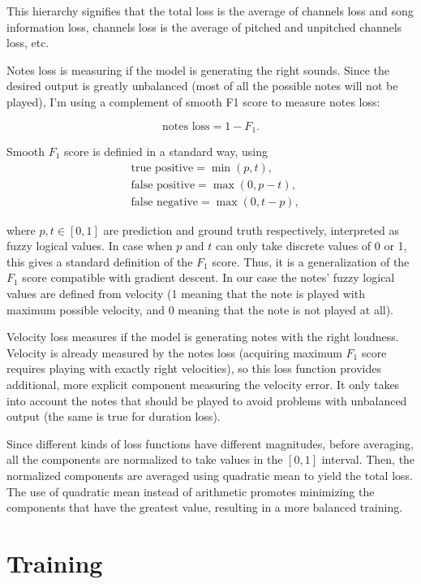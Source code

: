 \documentclass[en]{pracamgr}
\begin{document}
This hierarchy signifies that the total loss is the average of channels loss and song information loss, channels loss is the average of pitched and unpitched channels loss, etc.

Notes loss is measuring if the model is generating the right sounds.
Since the desired output is greatly unbalanced (most of all the possible notes will not be played), I'm using a complement of smooth F1 score to measure notes loss:
\nopagebreak

\begin{equation}
    \textrm{notes loss} = 1 - F_1.
\end{equation}

Smooth $F_1$ score is definied in a standard way, using
\nopagebreak
\begin{align}
    & \textrm{true positive} = \min(p, t), \\
    & \textrm{false positive} = \max(0, p - t), \\
    & \textrm{false negative} = \max(0, t - p),
\end{align}

where $p,t\in[0,1]$ are prediction and ground truth respectively, interpreted as fuzzy logical values.
In case when $p$ and $t$ can only take discrete values of 0 or 1, this gives a standard definition of the $F_1$ score.
Thus, it is a generalization of the $F_1$ score compatible with gradient descent.
In our case the notes' fuzzy logical values are defined from velocity (1 meaning that the note is played with maximum possible velocity, and 0 meaning that the note is not played at all).

Velocity loss measures if the model is generating notes with the right loudness.
Velocity is already measured by the notes loss (acquiring maximum $F_1$ score requires playing with exactly right velocities), so this loss function provides additional, more explicit component measuring the velocity error.
It only takes into account the notes that should be played to avoid problems with unbalanced output (the same is true for duration loss).

Since different kinds of loss functions have different magnitudes, before averaging, all the components are normalized to take values in the $[0,1]$ interval.
Then, the normalized components are averaged using quadratic mean to yield the total loss. The use of quadratic mean instead of arithmetic promotes minimizing the components that have the greatest value, resulting in a more balanced training.

\section{Training}
\end{document}
